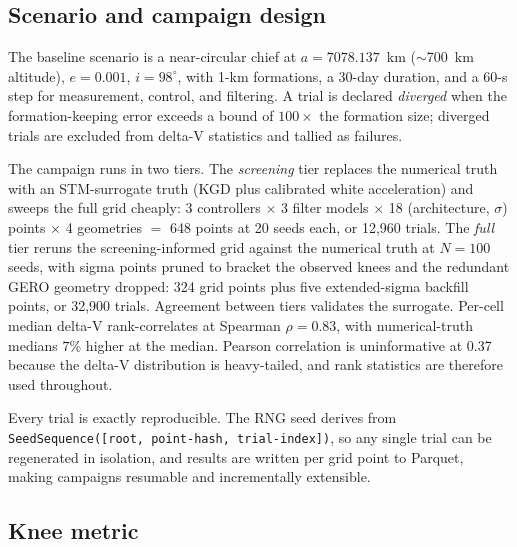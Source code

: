 \subsection{Scenario and campaign design}

The baseline scenario is a near-circular chief at
$a = 7078.137$~km ($\sim$700~km altitude), $e = 0.001$, $i = 98^\circ$,
with 1-km formations, a 30-day duration, and a 60-s step for measurement,
control, and filtering. A trial is declared \emph{diverged} when the
formation-keeping error exceeds a bound of $100\times$ the formation size;
diverged trials are excluded from delta-V statistics and tallied as
failures.

The campaign runs in two tiers. The \emph{screening} tier replaces the
numerical truth with an STM-surrogate truth (KGD plus calibrated white
acceleration) and sweeps the full grid cheaply: 3 controllers $\times$ 3
filter models $\times$ 18 (architecture, $\sigma$) points $\times$ 4
geometries $=$ 648 points at 20 seeds each, or 12{,}960 trials. The
\emph{full} tier reruns the screening-informed grid against the numerical
truth at $N = 100$ seeds, with sigma points pruned to bracket the observed
knees and the redundant GERO geometry dropped: 324 grid points plus five
extended-sigma backfill points, or 32{,}900 trials. Agreement between tiers
validates the surrogate. Per-cell median delta-V rank-correlates at Spearman
$\rho = 0.83$, with numerical-truth medians $7\%$ higher at the median.
Pearson correlation is uninformative at 0.37 because the delta-V
distribution is heavy-tailed, and rank statistics are therefore used
throughout.

Every trial is exactly reproducible. The RNG seed derives from
\texttt{SeedSequence([root, point-hash, trial-index])}, so any single trial
can be regenerated in isolation, and results are written per grid point to
Parquet, making campaigns resumable and incrementally extensible.

\subsection{Knee metric}\label{sec:kneemetric}

